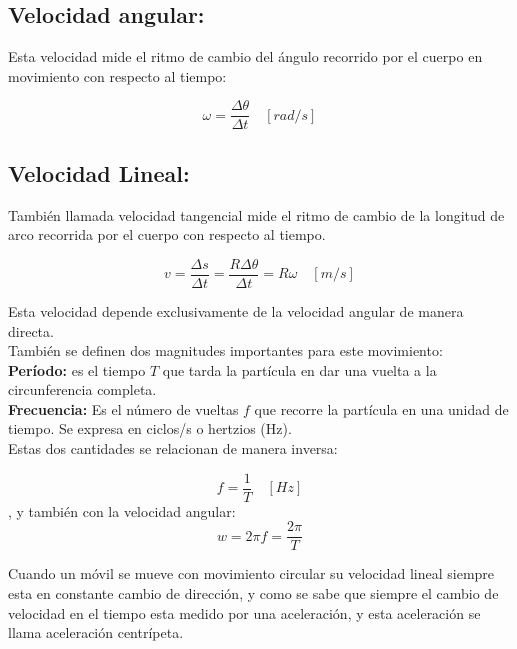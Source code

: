 \documentclass[a5paper,pagesize,10pt,bibtotoc,pointlessnumbers,
normalheadings,DIV=9,fleqn,x11names,table,twoside=false]{scrbook}
\begin{document}
\subsection{Velocidad angular:}

Esta velocidad mide el ritmo de cambio del ángulo recorrido por el cuerpo en movimiento con respecto al tiempo:

\begin{equation}
\omega = \frac{\Delta \theta}{\Delta t} \quad [rad/s]
\end{equation}

\subsection{Velocidad Lineal:}

También llamada velocidad tangencial mide el ritmo de cambio de la longitud de arco recorrida por el cuerpo con respecto al 
tiempo.

\begin{equation}
v = \frac{\Delta s}{\Delta t} = \frac{R\Delta \theta}{\Delta t} = R\omega \quad [m/s]
\end{equation}

Esta velocidad depende exclusivamente de la velocidad angular de manera directa.\\

También se definen dos magnitudes importantes para este movimiento:\\

\textbf{Período:} es el tiempo $T$ que tarda la partícula en dar una vuelta a la circunferencia completa.\\

\textbf{Frecuencia:} Es el número de vueltas $f$ que recorre la partícula en una unidad de tiempo. Se expresa en ciclos/s o 
hertzios (Hz).\\

Estas dos cantidades se relacionan de manera inversa:

\begin{equation}
f = \frac{1}{T}\quad [Hz]
\end{equation}
, y también con la velocidad angular: 
\begin{equation}
w = 2\pi f = \frac{2\pi}{T}
\end{equation}

Cuando un móvil se mueve con movimiento circular su velocidad lineal siempre esta en constante cambio de dirección, y como se 
sabe que siempre el cambio de velocidad en el tiempo esta medido por una aceleración, y esta aceleración se llama aceleración 
centrípeta.
\end{document}
